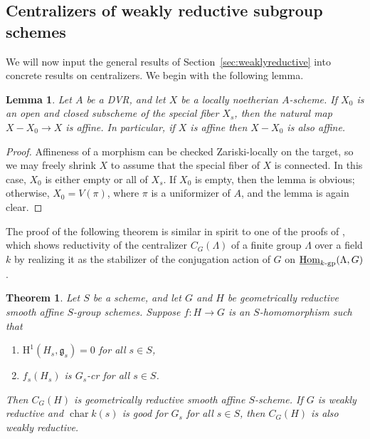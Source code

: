 \documentclass[11pt, letterpaper,english]{amsart}
\theoremstyle{plain}
\newtheorem{lemma}[lem]{Lemma}
\newtheorem{theorem}[lem]{Theorem}
\theoremstyle{definition}
\numberwithin{equation}{section}
\numberwithin{lem}{section}
\newcommand{\fg}{\mathfrak{g}}
\DeclareMathOperator{\Hom}{Hom}
\DeclareMathOperator{\chara} {char}
\begin{document}
%
%

%
%

%
%
%

%
%

%

%

%
%

%
%



\subsection{Centralizers of weakly reductive subgroup schemes} \label{ss:centralizerswr}

We will now input the general results of Section~\ref{sec:weaklyreductive} into concrete results on centralizers. We begin with the following lemma.

\begin{lemma}\label{lemma:removing-special-fiber-components}
    Let $A$ be a DVR, and let $X$ be a locally noetherian $A$-scheme. If $X_0$ is an open and closed subscheme of the special fiber $X_s$, then the natural map $X - X_0 \to X$ is affine. In particular, if $X$ is affine then $X - X_0$ is also affine.
\end{lemma}

\begin{proof}
    Affineness of a morphism can be checked Zariski-locally on the target, so we may freely shrink $X$ to assume that the special fiber of $X$ is connected. In this case, $X_0$ is either empty or all of $X_s$. If $X_0$ is empty, then the lemma is obvious; otherwise, $X_0 = V(\pi)$, where $\pi$ is a uniformizer of $A$, and the lemma is again clear.
\end{proof}

The proof of the following theorem is similar in spirit to one of the proofs of \cite[Theorem 2.1]{Prasad-Yu}, which shows reductivity of the centralizer $C_G(\Lambda)$ of a finite group $\Lambda$ over a field $k$ by realizing it as the stabilizer of the conjugation action of $G$ on $\underline{\Hom}_{k\textrm{-}\rm{gp}}(\Lambda, G)$.

\begin{theorem}\label{theorem:main-centralizer-theorem}
    Let $S$ be a scheme, and let $G$ and $H$ be geometrically reductive smooth affine $S$-group schemes. Suppose $f: H \to G$ is an $S$-homomorphism such that
    \begin{enumerate}
        \item $\mathrm{H}^1(H_s, \fg_s) = 0$ for all $s \in S$,
        \item $f_s(H_s)$ is $G_s$-cr for all $s \in S$.
    \end{enumerate}
    Then $C_G(H)$ is geometrically reductive smooth affine $S$-scheme. If $G$ is weakly reductive and $\chara k(s)$ is good for $G_s$ for all $s \in S$, then $C_G(H)$ is also weakly reductive.
\end{theorem}
\end{document}
